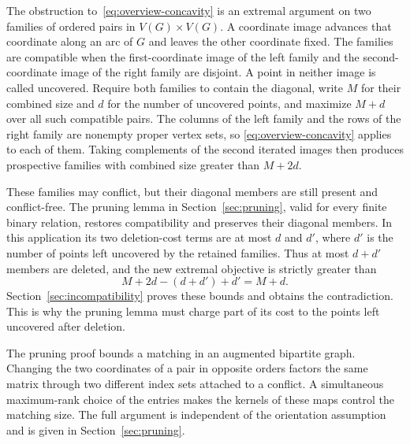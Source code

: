 The obstruction to~\eqref{eq:overview-concavity} is an extremal argument
on two families of ordered pairs in $V(G)\times V(G)$.  A coordinate image
advances that coordinate along an arc of $G$ and leaves the other coordinate
fixed.  The families are compatible when the first-coordinate image of the left family and the
second-coordinate image of the right family are disjoint.  A point in
neither image is called uncovered.  Require both families to contain the
diagonal, write $M$ for their combined size and $d$ for the number of
uncovered points, and maximize $M+d$ over all such compatible pairs.
The columns of the left family and the rows of the right family are
nonempty proper vertex sets, so
\eqref{eq:overview-concavity} applies to each of them.  Taking complements
of the second iterated images then produces prospective families with
combined size greater than $M+2d$.

These families may conflict, but their diagonal members are still present
and conflict-free.  The pruning lemma in
Section~\ref{sec:pruning}, valid for every finite binary relation,
restores compatibility and preserves their diagonal members.
In this application its two deletion-cost terms are at most $d$ and $d'$,
where $d'$ is the number of points left uncovered by the retained families.
Thus at most $d+d'$ members are deleted, and the new extremal objective is
strictly greater than
\[
 M+2d-(d+d')+d'=M+d.
\]
Section~\ref{sec:incompatibility} proves these bounds and obtains the
contradiction.  This is why the pruning lemma must charge part of its
cost to the points left uncovered after deletion.

The pruning proof bounds a matching in an augmented bipartite graph.
Changing the two coordinates of a pair in opposite orders factors the
same matrix through two different index sets attached to a conflict.
A simultaneous maximum-rank choice of the entries makes the kernels of
these maps control the matching size.  The full argument is independent
of the orientation assumption and is given in Section~\ref{sec:pruning}.
